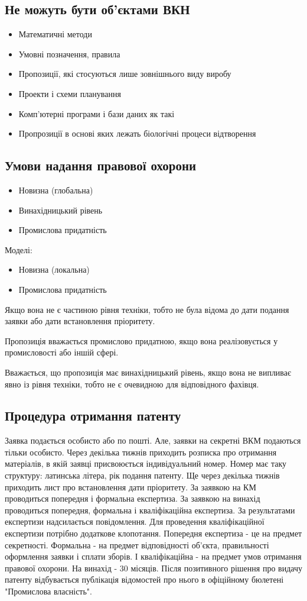 \subsection{Не можуть бути об’єктами ВКН}
\begin{itemize}
	\item Математичні методи
	\item Умовні позначення, правила
	\item Пропозиції, які стосуються лише зовнішнього виду виробу
	\item Проекти і схеми планування
	\item Комп’ютерні програми і бази даних як такі
	\item Пропрозиції в основі яких лежать біологічні процеси відтворення
\end{itemize}

\subsection{Умови надання правової охорони}
\begin{itemize}
	\item Новизна (глобальна)
	\item Винахідницький рівень
	\item Промислова придатність
\end{itemize}
Моделі:
\begin{itemize}
	\item Новизна (локальна)
	\item Промислова придатність
\end{itemize}
Якщо вона не є частиною рівня техніки, тобто не була відома до дати подання заявки або дати встановлення пріоритету.

Пропозиція вважається промислово придатною, якщо вона реалізовується у промисловості або іншій сфері.

Вважається, що пропозиція має винахідницький рівень, якщо вона не випливає явно із рівня техніки, тобто не є очевидною для відповідного фахівця.

\subsection{Процедура отримання патенту}
Заявка подається особисто або по пошті. Але, заявки на секретні ВКМ подаються тільки особисто. Через декілька тижнів приходить розписка про отримання матеріалів, в якій заявці присвоюється індивідуальний номер. Номер має таку структуру: латинська літера, рік подання патенту. Ще через декілька тижнів приходить лист про встановлення дати пріоритету. За заявкою на КМ проводиться попередня і формальна експертиза. За заявкою на винахід проводиться попередня, формальна і кваліфікаційна експертиза. За результатами експертизи надсилається повідомлення. Для проведення кваліфікаційної експертизи потрібно додаткове клопотання. Попередня експертиза - це на предмет секретності. Формальна - на предмет відповідності об’єкта, правильності оформлення заявки і сплати зборів. І кваліфікаційна - на предмет умов отримання правової охорони. На винахід - 30 місяців. Після позитивного рішення про видачу патенту відбувається публікація відомостей про нього в офіційному бюлетені "Промислова власність".